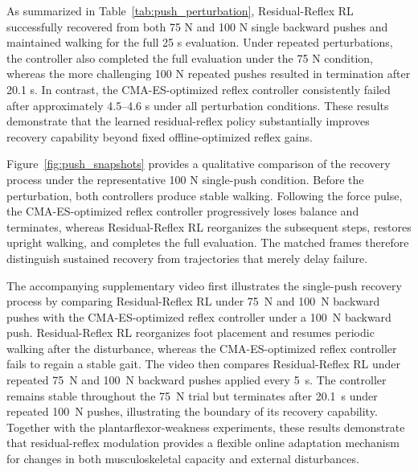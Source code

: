 \documentclass[acmtog,review,anonymous]{acmart}
\newcommand{\suppvideo}{supplementary video}
\begin{document}
As summarized in Table~\ref{tab:push_perturbation}, Residual-Reflex RL successfully recovered from both 75 N and 100 N single backward pushes and maintained walking for the full 25 s evaluation. Under repeated perturbations, the controller also completed the full evaluation under the 75 N condition, whereas the more challenging 100 N repeated pushes resulted in termination after 20.1 s. In contrast, the CMA-ES-optimized reflex controller consistently failed after approximately 4.5–4.6 s under all perturbation conditions. These results demonstrate that the learned residual-reflex policy substantially improves recovery capability beyond fixed offline-optimized reflex gains.

Figure~\ref{fig:push_snapshots} provides a qualitative comparison of the recovery process under the representative 100 N single-push condition. Before the perturbation, both controllers produce stable walking. Following the force pulse, the CMA-ES-optimized reflex controller progressively loses balance and terminates, whereas Residual-Reflex RL reorganizes the subsequent steps, restores upright walking, and completes the full evaluation. The matched frames therefore distinguish sustained recovery from trajectories that merely delay failure.

The accompanying \suppvideo{} first illustrates the single-push recovery process by comparing Residual-Reflex RL under 75~N and 100~N backward pushes with the CMA-ES-optimized reflex controller under a 100~N backward push. Residual-Reflex RL reorganizes foot placement and resumes periodic walking after the disturbance, whereas the CMA-ES-optimized reflex controller fails to regain a stable gait. The video then compares Residual-Reflex RL under repeated 75~N and 100~N backward pushes applied every 5~s. The controller remains stable throughout the 75~N trial but terminates after 20.1~s under repeated 100~N pushes, illustrating the boundary of its recovery capability. Together with the plantarflexor-weakness experiments, these results demonstrate that residual-reflex modulation provides a flexible online adaptation mechanism for changes in both musculoskeletal capacity and external disturbances.
\end{document}
